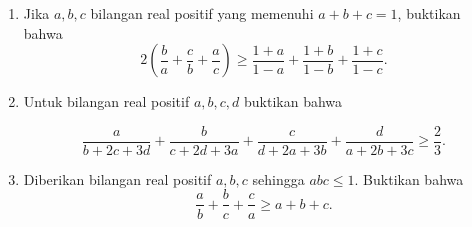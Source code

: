 \documentclass[11pt]{scrartcl}
\begin{document}
\begin{enumerate}
\item Jika $a, b, c$ bilangan real positif yang memenuhi $a+b+c=1$, buktikan bahwa
\[2\left(\frac{b}{a}+\frac{c}{b}+\frac{a}{c}\right)\ge\frac{1+a}{1-a}+\frac{1+b}{1-b}+\frac{1+c}{1-c}.\]

\item Untuk bilangan real positif $a, b, c, d$ buktikan bahwa

\[\frac{a}{b+2c+3d}+\frac{b}{c+2d+3a}+\frac{c}{d+2a+3b}+\frac{d}{a+2b+3c}\ge\frac{2}{3}.\]

\item Diberikan bilangan real positif $a, b, c$ sehingga $abc \le 1$. Buktikan bahwa
\[\frac{a}{b}+\frac{b}{c}+\frac{c}{a}\ge a+b+c.\]
\end{enumerate}
\end{document}
